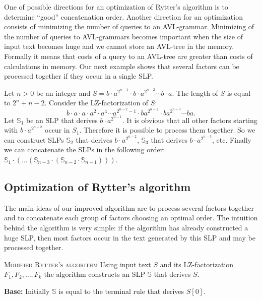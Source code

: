 ﻿\documentclass[11pt]{article}
\theoremstyle{remark}
\newcounter{examples}
\newenvironment{example}{\addtocounter{examples}{1}\trivlist\item[\hskip\labelsep{\bf
Example \arabic{examples}.}] }{\endtrivlist}
\newcommand{\header}[1]{
    \noindent \textsc{#1}
}
\newcommand{\slp}[1]{\mathbb{#1}}
\begin{document}
One of possible directions for an optimization of Rytter's algorithm is to determine ``good'' concatenation order.
Another direction for an optimization consists of minimizing the number of queries to an AVL-grammar. Minimizing of the
number of queries to AVL-grammars becomes important when the size of input text becomes huge and we cannot store an
AVL-tree in the memory. Formally it means that costs of a query to an AVL-tree are greater than costs of calculations
in memory. Our next example shows that several factors can be processed together if they occur in a single SLP.

\begin{example}
Let $n > 0$ be an integer and $S = b\cdot a^{2^{n-1}}\cdot b \cdot a^{2^{n-2}} \cdots b \cdot a$. The length of $S$
is equal to $2^n + n - 2$. Consider the LZ-factorization of $S$: $$ b \cdot a \cdot a \cdot a^2 \cdot a^4 \cdots
a^{2^{n-2} - 1} \cdot ba^{2^{n-2}} \cdot ba^{2^{n-3}} \cdots ba.$$ Let $\slp{S}_1$ be an SLP that derives $b \cdot
a^{2^{n-1}}$. It is obvious that all other factors starting with $b \cdot a^{2^{n-2}}$ occur in $S_1$. Therefore it is
possible to process them together. So we can construct SLPs $\slp{S}_2$ that derives $b \cdot a^{2^{n-2}}$,
$\slp{S}_3$ that derives $b \cdot a^{2^{n-3}}$, etc. Finally we can concatenate the SLPs in the following
order: $\slp{S}_1\cdot(\dots(\slp{S}_{n-3}\cdot(\slp{S}_{n-2} \cdot \slp{S}_{n-1})))$.
\end{example}

\subsection{Optimization of Rytter's algorithm}

The main ideas of our improved algorithm are to process several factors together and to concatenate each group of
factors choosing an optimal order. The intuition behind the algorithm is very simple: if the algorithm has already 
constructed a huge SLP, then most factors occur in the text generated by this SLP and may be processed together.

\medskip

\header{Modified Rytter's algorithm} Using input text $S$ and its LZ-factorization $F_1, F_2, \dots, F_k$ the algorithm
constructs an SLP $\slp{S}$ that derives $S$.

\smallskip

\textbf{Base:} Initially $\slp{S}$ is equal to the terminal rule that derives $S[0]$.
\end{document}
